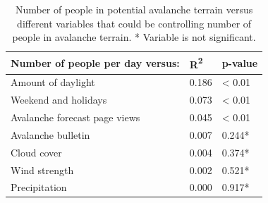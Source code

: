 \documentclass[authordate,empirical]{jote-new-article}
\begin{document}
\begin{table}
  \begin{fullwidth}
    \caption{Number of people in potential avalanche terrain versus different variables that could be controlling number of people in avalanche terrain. * Variable is not significant.}

    \centering
    \begin{tabular}{@{} l l l  @{}}
      \toprule
      \textbf{Number of people per day versus:} &
      \textbf{R}{\textsuperscript{\textbf{2}}}
                                                & \textbf{p-value}   \\
      \midrule

      Amount of daylight                        & 0.186            &
      < 0.01                                                         \\

      Weekend and holidays                      & 0.073            &
      < 0.01                                                         \\

      Avalanche forecast page views             & 0.045            &
      < 0.01                                                         \\

      Avalanche bulletin                        & 0.007            &
      0.244*                                                         \\

      Cloud cover                               & 0.004            &
      0.374*                                                         \\

      Wind strength                             & 0.002            &
      0.521*                                                         \\

      Precipitation                             & 0.000            &
      0.917*                                                         \\
      \bottomrule
    \end{tabular}
  \end{fullwidth}
\end{table}
\end{document}
